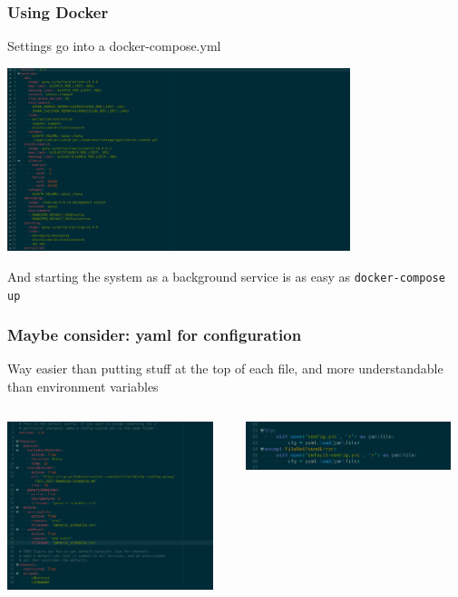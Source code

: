\documentclass[10pt]{beamer}
\begin{document}
\begin{frame}[c]\frametitle{Using Docker}

Settings go into a docker-compose.yml

\centerline{\includegraphics[width=10cm]{figs/dockercompose.png}}

And starting the system as a background service is as easy as \texttt{docker-compose up}


\end{frame}

\begin{frame}[c]\frametitle{Maybe consider: yaml for configuration}

Way easier than putting stuff at the top of each file, and more understandable than environment variables

\begin{columns}[T]
  \begin{column}{.48\textwidth}
  \centerline{\includegraphics[width=6cm]{figs/lingbotyml.png}}
  \end{column}

  \pause



  \begin{column}{.48\textwidth}
  \centerline{\includegraphics[width=6cm]{figs/lingbotymlsource.png}}


  \end{column}
  \end{columns}
\end{frame}
\end{document}
